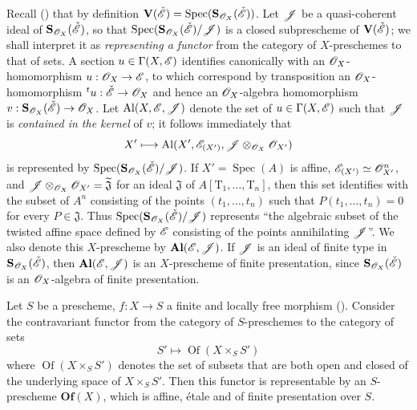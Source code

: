 \begin{env}[18.5.2]
\label{IV.18.5.2}
Recall () that by definition $\mathbf{V}(\check{\mathscr{E}})=\operatorname{Spec}(\mathbf{S}_{\mathscr{O}_X}(\check{\mathscr{E}}))$.
Let $\mathscr{J}$ be a quasi-coherent ideal of $\mathbf{S}_{\mathscr{O}_X}(\check{\mathscr{E}})$, so that $\operatorname{Spec}(\mathbf{S}_{\mathscr{O}_X}(\check{\mathscr{E}})/\mathscr{J})$ is a closed subprescheme of $\mathbf{V}(\check{\mathscr{E}})$; we shall interpret it as \emph{representing a functor} from the category of $X$-preschemes to that of sets.
A section $u\in\Gamma(X,\mathscr{E})$ identifies canonically with an $\mathscr{O}_X$-homomorphism $u:\mathscr{O}_X\to\mathscr{E}$, to which correspond by transposition an $\mathscr{O}_X$-homomorphism ${}^t u:\check{\mathscr{E}}\to\mathscr{O}_X$ and hence an $\mathscr{O}_X$-algebra homomorphism $v:\mathbf{S}_{\mathscr{O}_X}(\check{\mathscr{E}})\to\mathscr{O}_X$.
Let $\mathrm{Al}(X,\mathscr{E},\mathscr{J})$ denote the set of $u\in\Gamma(X,\mathscr{E})$ such that $\mathscr{J}$ is \emph{contained in the kernel} of $v$;
it follows immediately that
\[
X'\longmapsto\mathrm{Al}(X',\mathscr{E}_{(X')},\mathscr{J}\otimes_{\mathscr{O}_X}\mathscr{O}_{X'})
\]
is represented by $\operatorname{Spec}(\mathbf{S}_{\mathscr{O}_X}(\check{\mathscr{E}})/\mathscr{J})$.
If $X'=\operatorname{Spec}(A)$ is affine, $\mathscr{E}_{(X')}\simeq\mathscr{O}_{X'}^n$, and $\mathscr{J}\otimes_{\mathscr{O}_X}\mathscr{O}_{X'}=\widetilde{\mathfrak{J}}$ for an ideal $\mathfrak{J}$ of $A[\mathrm{T}_1,\ldots,\mathrm{T}_n]$, then this set identifies with the subset of $A^n$ consisting of the points $(t_1,\ldots,t_n)$ such that $P(t_1,\ldots,t_n)=0$ for every $P\in\mathfrak{J}$.
Thus $\operatorname{Spec}(\mathbf{S}_{\mathscr{O}_X}(\check{\mathscr{E}})/\mathscr{J})$ represents ``the algebraic subset of the twisted affine space defined by $\mathscr{E}$ consisting of the points annihilating $\mathscr{J}$''.
We also denote this $X$-prescheme by $\mathbf{Al}(\mathscr{E},\mathscr{J})$.
If $\mathscr{J}$ is an ideal of finite type in $\mathbf{S}_{\mathscr{O}_X}(\check{\mathscr{E}})$, then $\mathbf{Al}(\mathscr{E},\mathscr{J})$ is an $X$-prescheme of finite presentation, since $\mathbf{S}_{\mathscr{O}_X}(\check{\mathscr{E}})$ is an $\mathscr{O}_X$-algebra of finite presentation.
\end{env}

\begin{lemma}[18.5.3]
\label{IV.18.5.3}
Let $S$ be a prescheme, $f:X\to S$ a finite and locally free morphism ().
Consider the contravariant functor from the category of $S$-preschemes to the category of sets
\[
\label{IV.18.5.3.1}
S'\mapsto\operatorname{Of}(X\times_S S')
\tag{18.5.3.1}
\]
where $\operatorname{Of}(X\times_S S')$ denotes the set of subsets that are both open and closed of the underlying space of $X\times_S S'$.
Then this functor is representable by an $S$-prescheme $\mathbf{Of}(X)$, which is affine, \'etale and of finite presentation over $S$.
\end{lemma}


